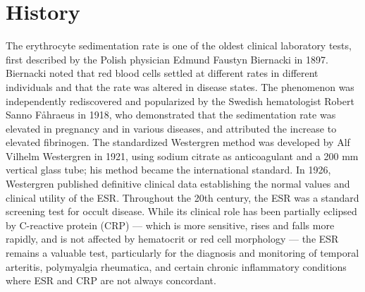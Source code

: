 \section*{History}
The erythrocyte sedimentation rate is one of the oldest clinical laboratory tests, first described by the Polish physician Edmund Faustyn Biernacki in 1897. Biernacki noted that red blood cells settled at different rates in different individuals and that the rate was altered in disease states. The phenomenon was independently rediscovered and popularized by the Swedish hematologist Robert Sanno F{\aa}hraeus in 1918, who demonstrated that the sedimentation rate was elevated in pregnancy and in various diseases, and attributed the increase to elevated fibrinogen. The standardized Westergren method was developed by Alf Vilhelm Westergren in 1921, using sodium citrate as anticoagulant and a 200 mm vertical glass tube; his method became the international standard. In 1926, Westergren published definitive clinical data establishing the normal values and clinical utility of the ESR. Throughout the 20th century, the ESR was a standard screening test for occult disease. While its clinical role has been partially eclipsed by C-reactive protein (CRP) --- which is more sensitive, rises and falls more rapidly, and is not affected by hematocrit or red cell morphology --- the ESR remains a valuable test, particularly for the diagnosis and monitoring of temporal arteritis, polymyalgia rheumatica, and certain chronic inflammatory conditions where ESR and CRP are not always concordant.

